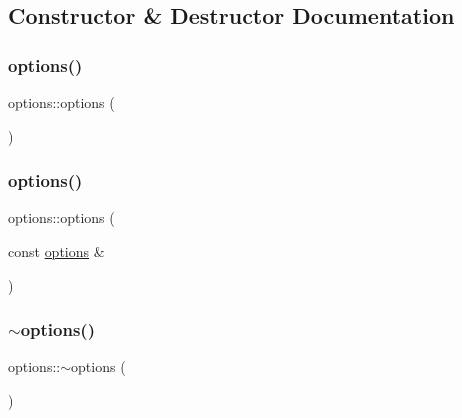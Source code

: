 \subsection{Constructor \& Destructor Documentation}
\mbox{\label{classoptions_a41a256b4ba3b2d68a2d72b9245aa0c4d}} 
\subsubsection{\texorpdfstring{options()}{options()}\hspace{0.1cm}{\footnotesize\ttfamily [1/2]}}
{\footnotesize\ttfamily options\+::options (\begin{DoxyParamCaption}{ }\end{DoxyParamCaption})\hspace{0.3cm}{\ttfamily [inline]}}

\mbox{\label{classoptions_a13cdbe12daae1dfd7e161a5527de0742}} 
\subsubsection{\texorpdfstring{options()}{options()}\hspace{0.1cm}{\footnotesize\ttfamily [2/2]}}
{\footnotesize\ttfamily options\+::options (\begin{DoxyParamCaption}\item[{const \mbox{\hyperlink{classoptions}{options}} \&}]{ }\end{DoxyParamCaption})\hspace{0.3cm}{\ttfamily [delete]}}

\mbox{\label{classoptions_aeb360f60766b8cff26c8ec46c1bc78ca}} 
\subsubsection{\texorpdfstring{$\sim$options()}{~options()}}
{\footnotesize\ttfamily options\+::$\sim$options (\begin{DoxyParamCaption}{ }\end{DoxyParamCaption})\hspace{0.3cm}{\ttfamily [inline]}}



